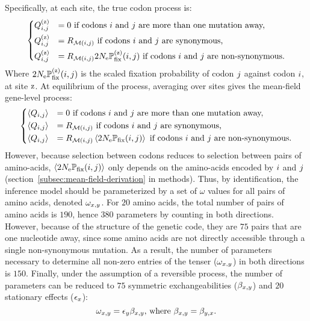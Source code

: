 Specifically, at each site, the true codon process is:
\begin{equation}
    \begin{dcases}
        Q_{{i}, {j}}^{(\text{z})} & = 0 \text{ if codons ${i}$ and ${j}$ are more than one mutation away,} \\
        Q_{{i}, {j}}^{(\text{z})} & = R_{\mathcal{M}({i}, {j})} \text{ if codons ${i}$ and ${j}$ are synonymous,} \\
        Q_{{i}, {j}}^{(\text{z})} & = R_{\mathcal{M}({i}, {j})} 2 N_{\text{e}} \mathbb{P}_{\text{fix}}^{(\text{z})}({i}, {j}) \text{ if codons ${i}$ and ${j}$ are non-synonymous}.
    \end{dcases}
    \label{eq:codon-site-processs}
\end{equation}
Where $2 N_{\text{e}} \mathbb{P}_{\text{fix}}^{(\text{z})}({i}, {j})$ is the scaled fixation probability of codon ${j}$ against codon ${i}$, at site $\text{z}$.
At equilibrium of the process, averaging over sites gives the mean-field gene-level process:
\begin{equation}
    \begin{dcases}
        \left\langle Q_{{i}, {j}} \right\rangle & = 0 \text{ if codons ${i}$ and ${j}$ are more than one mutation away,} \\
        \left\langle Q_{{i}, {j}} \right\rangle & = R_{\mathcal{M}({i}, {j})} \text{ if codons ${i}$ and ${j}$ are synonymous,} \\
        \left\langle Q_{{i}, {j}} \right\rangle & = R_{\mathcal{M}({i}, {j})} \left\langle 2 N_{\text{e}} \mathbb{P}_{\text{fix}} ({i}, {j}) \right\rangle \text{ if codons ${i}$ and ${j}$ are non-synonymous}.
    \end{dcases}
    \label{eq:codon-avg-process}
\end{equation}
However, because selection between codons reduces to selection between pairs of amino-acids, $\left\langle 2 N_{\text{e}} \mathbb{P}_{\text{fix}} ({i}, {j}) \right\rangle$ only depends on the amino-acids encoded by ${i}$ and ${j}$ (section~\ref{subsec:mean-field-derivation} in methods).
Thus, by identification, the inference model should be parameterized by a set of $\omega$ values for all pairs of amino acids, denoted $\omega_{x, y}$.
For $20$ amino acids, the total number of pairs of amino acids is $190$, hence $380$ parameters by counting in both directions.
However, because of the structure of the genetic code, they are $75$ pairs that are one nucleotide away, since some amino acids are not directly accessible through a single non-synonymous mutation.
As a result, the number of parameters necessary to determine all non-zero entries of the tenser ($\omega_{x, y}$) in both directions is $150$.
Finally, under the assumption of a reversible process, the number of parameters can be reduced to $75$ symmetric exchangeabilities ($\beta_{x, y}$) and $20$ stationary effects ($\epsilon_{x}$):
\begin{equation}
    \omega_{x, y} = \epsilon_{y} \beta_{x, y}\text{, where } \beta_{x, y} = \beta_{y, x}.\label{eq:omega-reversible}
\end{equation}

